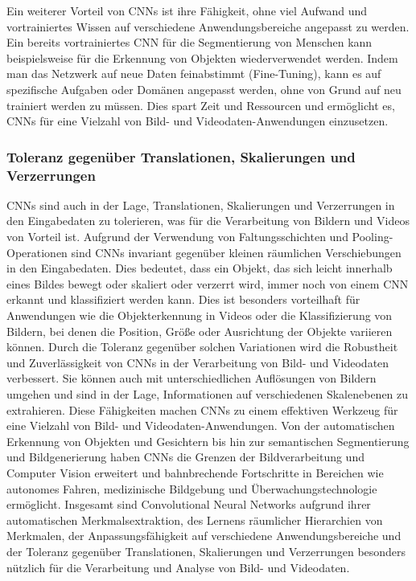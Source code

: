     Ein weiterer Vorteil von CNNs ist ihre Fähigkeit, ohne viel Aufwand und vortrainiertes Wissen auf verschiedene Anwendungsbereiche angepasst zu werden. 
    Ein bereits vortrainiertes CNN für die Segmentierung von Menschen kann beispielsweise für die Erkennung von Objekten wiederverwendet werden. 
    Indem man das Netzwerk auf neue Daten feinabstimmt (Fine-Tuning), kann es auf spezifische Aufgaben oder Domänen angepasst werden, ohne von Grund auf neu trainiert werden zu müssen.
    Dies spart Zeit und Ressourcen und ermöglicht es, CNNs für eine Vielzahl von Bild- und Videodaten-Anwendungen einzusetzen.

\subsubsection{Toleranz gegenüber Translationen, Skalierungen und Verzerrungen}

    CNNs sind auch in der Lage, Translationen, Skalierungen und Verzerrungen in den Eingabedaten zu tolerieren, was für die Verarbeitung von Bildern und Videos von Vorteil ist. 
    Aufgrund der Verwendung von Faltungsschichten und Pooling-Operationen sind CNNs invariant gegenüber kleinen räumlichen Verschiebungen in den Eingabedaten. 
    Dies bedeutet, dass ein Objekt, das sich leicht innerhalb eines Bildes bewegt oder skaliert oder verzerrt wird, immer noch von einem CNN erkannt und klassifiziert werden kann. 
    Dies ist besonders vorteilhaft für Anwendungen wie die Objekterkennung in Videos oder die Klassifizierung von Bildern, bei denen die Position, Größe oder Ausrichtung der Objekte variieren können.
    Durch die Toleranz gegenüber solchen Variationen wird die Robustheit und Zuverlässigkeit von CNNs in der Verarbeitung von Bild- und Videodaten verbessert. 
    Sie können auch mit unterschiedlichen Auflösungen von Bildern umgehen und sind in der Lage, Informationen auf verschiedenen Skalenebenen zu extrahieren.
    Diese Fähigkeiten machen CNNs zu einem effektiven Werkzeug für eine Vielzahl von Bild- und Videodaten-Anwendungen. 
    Von der automatischen Erkennung von Objekten und Gesichtern bis hin zur semantischen Segmentierung und Bildgenerierung haben CNNs die Grenzen der Bildverarbeitung und Computer Vision erweitert und bahnbrechende Fortschritte in Bereichen wie autonomes Fahren, medizinische Bildgebung und Überwachungstechnologie ermöglicht.
    Insgesamt sind Convolutional Neural Networks aufgrund ihrer automatischen Merkmalsextraktion, des Lernens räumlicher Hierarchien von Merkmalen, der Anpassungsfähigkeit auf verschiedene Anwendungsbereiche und der Toleranz gegenüber Translationen, Skalierungen und Verzerrungen besonders nützlich für die Verarbeitung und Analyse von Bild- und Videodaten.

